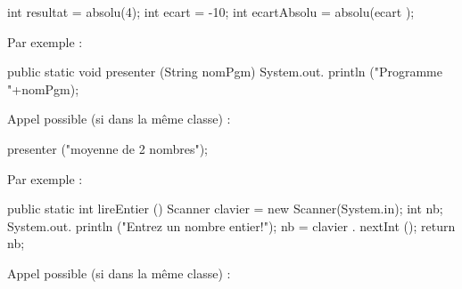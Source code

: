 \documentclass[11pt,a4paper]{article}
\begin{document}
            \par
        \begin{Java}

int resultat = absolu(4);
int ecart = -10;
int ecartAbsolu = absolu(ecart );
				\end{Java}Par exemple : 
            \par
        \begin{Java}

public static void presenter (String nomPgm) {
    System.out. println ("Programme "+nomPgm);
}				\end{Java}
        Appel possible (si dans la m\^eme classe) :
      
            \par
        \begin{Java}

presenter ("moyenne de 2 nombres");
				\end{Java}Par exemple : 
            \par
        \begin{Java}

public static int lireEntier () {
    Scanner clavier = new Scanner(System.in);
    int nb;
    System.out. println ("Entrez un nombre entier!");
    nb = clavier . nextInt ();
    return nb;
}				\end{Java}
        Appel possible (si dans la m\^eme classe) :
      
\end{document}
